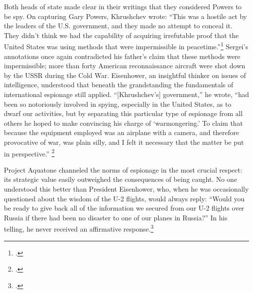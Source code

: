 \documentclass[14pt]{extarticle}
\begin{document}
Both heads of state made clear in their writings that they considered Powers to be spy. On capturing Gary Powers, Khrushchev wrote: ``This was a hostile act by the leaders of the U.S. government, and they made no attempt to conceal it. They didn't think we had the capability of \textelp{} acquiring irrefutable proof that the United States was using methods that were impermissible in peacetime.''\footcite[p.~239]{khrushchev_memoirs_2007} Sergei's annotations once again contradicted his father's claim that these methods were impermissible; more than forty American reconnaissance aircraft were shot down by the USSR during the Cold War. Eisenhower, an insightful thinker on issues of intelligence, understood that beneath the grandstanding the fundamentals of international espionage still applied. \enquote{[Khrushchev's] government,} he wrote, \enquote{had been so notoriously involved in spying, especially in the United States, as to dwarf our activities, but by separating this particular type of espionage from all others he hoped to make convincing his charge of \enquote{warmongering.} To claim that because the equipment employed was an airplane with a camera, and therefore provocative of war, was plain silly, and I felt it necessary that the matter be put in perspective.} \footcite[p.~551]{eisenhower_waging_1965}


Project Aquatone channeled the norms of espionage in the most crucial respect: its strategic value easily outweighed the consequences of being caught. No one understood this better than President Eisenhower, who, when he was occasionally questioned about the wisdom of the U-2 flights, would always reply: \enquote{Would you be ready to give back all of the information we secured from our U-2 flights over Russia if there had been no disaster to one of our planes in Russia?} In his telling, he never received an affirmative response.\footcite[p.~559]{eisenhower_waging_1965}



\end{document}
